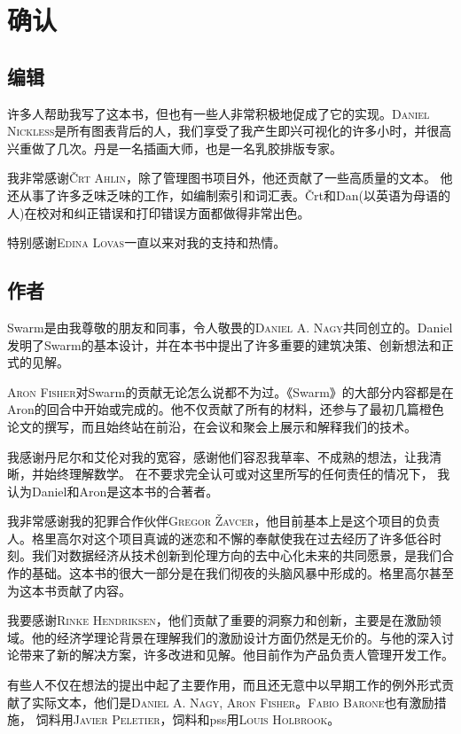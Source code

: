 \newcommand{\person}[1]{{\scshape #1}}
\chapter{确认\statusgreen}

\section*{编辑}

许多人帮助我写了这本书，但也有一些人非常积极地促成了它的实现。\person{Daniel Nickless}是所有图表背后的人，我们享受了我产生即兴可视化的许多小时，并很高兴重做了几次。丹是一名插画大师，也是一名乳胶排版专家。 

我非常感谢\person{Črt Ahlin}，除了管理图书项目外，他还贡献了一些高质量的文本。
他还从事了许多乏味乏味的工作，如编制索引和词汇表。Črt和Dan(以英语为母语的人)在校对和纠正错误和打印错误方面都做得非常出色。

特别感谢\person{Edina Lovas}一直以来对我的支持和热情。 

\section*{作者}

Swarm是由我尊敬的朋友和同事，令人敬畏的\person{Daniel A. Nagy}共同创立的。Daniel发明了Swarm的基本设计，并在本书中提出了许多重要的建筑决策、创新想法和正式的见解。 

\person{Aron Fisher}对Swarm的贡献无论怎么说都不为过。《Swarm》的大部分内容都是在Aron的回合中开始或完成的。他不仅贡献了所有的材料，还参与了最初几篇橙色论文的撰写，而且始终站在前沿，在会议和聚会上展示和解释我们的技术。

我感谢丹尼尔和艾伦对我的宽容，感谢他们容忍我草率、不成熟的想法，让我清晰，并始终理解数学。
在不要求完全认可或对这里所写的任何责任的情况下，
我认为Daniel和Aron是这本书的合著者。

我非常感谢我的犯罪合作伙伴\person{Gregor Žavcer}，他目前基本上是这个项目的负责人。格里高尔对这个项目真诚的迷恋和不懈的奉献使我在过去经历了许多低谷时刻。我们对数据经济从技术创新到伦理方向的去中心化未来的共同愿景，是我们合作的基础。这本书的很大一部分是在我们彻夜的头脑风暴中形成的。格里高尔甚至为这本书贡献了内容。

我要感谢\person{Rinke Hendriksen}，他们贡献了重要的洞察力和创新，主要是在激励领域。他的经济学理论背景在理解我们的激励设计方面仍然是无价的。与他的深入讨论带来了新的解决方案，许多改进和见解。他目前作为产品负责人管理开发工作。

有些人不仅在想法的提出中起了主要作用，而且还无意中以早期工作的例外形式贡献了实际文本，他们是\person{Daniel A. Nagy}, \person{Aron Fisher}。\person{Fabio Barone}也有激励措施，  
饲料用\person{Javier Peletier}，饲料和pss用\person{Louis Holbrook}。 

